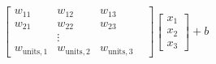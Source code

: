 \documentclass[preview]{standalone}
\begin{document}
\begin{align*}
\begin{bmatrix} w_{11} & w_{12} & w_{13} \\
                       w_{21} & w_{22} & w_{23} & \\ & \vdots  & \\
                       w_{\text{units}, 1} & w_{\text{units}, 2} & w_{\text{units}, 3}  
                       \end{bmatrix} \begin{bmatrix} x_1 \\ x_2 \\ x_3  \end{bmatrix} + b
\end{align*}
\end{document}
